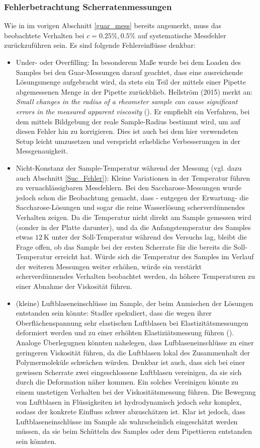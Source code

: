 \documentclass[11pt,a4paper,oneside]{scrartcl}
\begin{document}
\subsubsection{Fehlerbetrachtung Scherratenmessungen}\label{Guar_Fehler}
Wie in im vorigen Abschnitt \ref{guar_mess} bereits angemerkt, muss das beobachtete Verhalten bei $c=0.25\%,0.5\%$ auf systematische Messfehler zurückzuführen sein. Es sind folgende Fehlereinflüsse denkbar:
\begin{itemize}
\item Under- oder Overfilling: In besonderem Maße wurde bei dem Loaden des Samples bei den Guar-Messungen darauf geachtet, dass eine ausreichende Lösungsmenge aufgebracht wird, da stets ein Teil der mittels einer Pipette abgemessenen Menge in der Pipette zurückblieb. Hellström (2015) merkt an: \emph{\glqq Small changes in the radius of a rheometer sample can cause significant errors in the measured apparent viscosity \grqq} (\cite{Hellström_2015}). Er empfiehlt ein Verfahren, bei dem mittels Bildgebung der reale Sample-Radius bestimmt wird, um auf diesen Fehler hin zu korrigieren. Dies ist auch bei dem hier verwendeten Setup leicht umzusetzen und verspricht erhebliche Verbesserungen in der Messgenauigkeit.
\item Nicht-Konstanz der Sample-Temperatur während der Messung (vgl. dazu auch Abschnitt \ref{Suc_Fehler}): Kleine Variationen in der Temperatur führen zu vernachlässigbaren Messfehlern. Bei den Saccharose-Messungen wurde jedoch schon die Beobachtung gemacht, dass - entgegen der Erwartung- die Saccharose-Lösungen und sogar die reine Wasserlösung scherverdünnendes Verhalten zeigen. Da die Temperatur nicht direkt am Sample gemessen wird (sonder in der Platte darunter), und da die Anfangstemperatur des Samples etwas $12\ \mathrm K$ unter der Soll-Temperatur während des Versuchs lag, bleibt die Frage offen, ob das Sample bei der ersten Scherrate für die bereits die Soll-Temperatur erreicht hat. Würde sich die Temperatur des Samples im Verlauf der weiteren Messungen weiter erhöhen, würde ein verstärkt scherverdünnendes Verhalten beobachtet werden, da höhere Temperaturen zu einer Abnahme der Viskosität führen.
\item (kleine) Luftblaseneinschlüsse im Sample, der beim Anmischen der Lösungen entstanden sein könnte: Stadler spekuliert, dass die wegen ihrer Oberflächenspannung sehr elastischen Luftblasen bei Elastizitätsmessungen deformiert werden und zu einer erhöhten Elastiziätsmessung führen (\cite{Stadler2014}). Analoge Überlegugnen könnten nahelegen, dass Lufblaseneinschlüsse zu einer geringeren Viskosität führen, da die Luftblasen lokal des Zusammenhalt der Polymermoleküle schwächen würden. Denkbar ist auch, dass sich bei einer gewissen Scherrate zwei eingeschlossene Luftblasen vereinigen, da sie sich durch die Deformation näher kommen. Ein solches Vereinigen könnte zu einem unstetigen Verhalten bei der Viskositätsmessung führen. Die Bewegung von Luftblasen in Flüssigkeiten ist hydrodynamisch jedoch sehr komplex, sodass der konkrete Einfluss schwer abzuschätzen ist.  Klar ist jedoch, dass Luftblaseneinschlüsse im Sample als wahrscheinlich eingeschätzt werden müssen, da sie beim Schütteln des Samples oder dem Pipettieren entstanden sein könnten.

\end{itemize}
\end{document}
